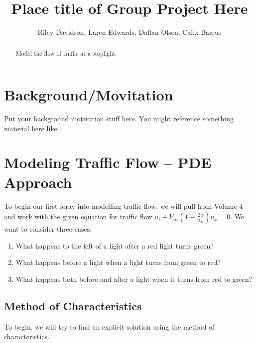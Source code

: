 \documentclass[12pt]{article}
\begin{document}
\title{Place title of Group Project Here}
\author{Riley Davidson, Laren Edwards, Dallan Olsen, Calix Barrus}

\date{}

\maketitle

\begin{abstract}
Model the flow of traffic at a stoplight. 
\end{abstract}

\section{Background/Movitation}
Put your background motivation stuff here. You might reference something material here like \cite{ref1}.

\section{Modeling Traffic Flow – PDE Approach}

To begin our first foray into modelling traffic flow, we will pull from Volume 4 and work with the given equation for traffic flow $u_t + V_\infty \left(1 - \frac{2u}{u_{\infty}} \right) u_x = 0$. We want to consider three cases:
\begin{enumerate}
    \item What happens to the left of a light after a red light turns green?
    \item What happens before a light when a light turns from green to red? 
    \item What happens both before and after a light when it turns from red to green?
\end{enumerate}

\subsection{Method of Characteristics} 
To begin, we will try to find an explicit solution using the method of characteristics. 
\end{document}
